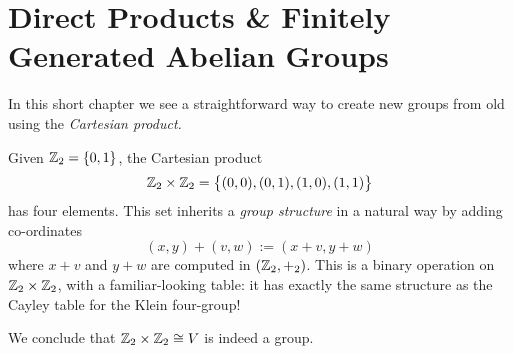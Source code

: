 \graphicspath{{4direct/asy/}}

\section{Direct Products \& Finitely Generated Abelian Groups}\label{chap:direct}


In this short chapter we see a straightforward way to create new groups from old using the \emph{Cartesian product.}

\begin{example}{}{}
Given $\mathbb{Z}_2=\{0,1\}$, the Cartesian product
\[\mathbb{Z}_2\times \mathbb{Z}_2=\bigl\{(0,0),(0,1),(1,0),(1,1)\bigr\}\]
has four elements. This set inherits a \emph{group structure} in a natural way by adding co-ordinates
\[(x,y)+(v,w):=(x+v,y+w)\]
where $x+v$ and $y+w$ are computed in $(\mathbb{Z}_2,+_2)$. This is a binary operation on $\mathbb{Z}_2\times\mathbb{Z}_2$, with a familiar-looking table: it has exactly the same structure as the Cayley table for the Klein four-group!
\begin{quote}
\qquad\scalebox{1.5}{$\leftrightsquigarrow$}\qquad
{}
\end{quote}
We conclude that $\mathbb{Z}_2\times\mathbb{Z}_2\cong V$ is indeed a group.
\end{example}

